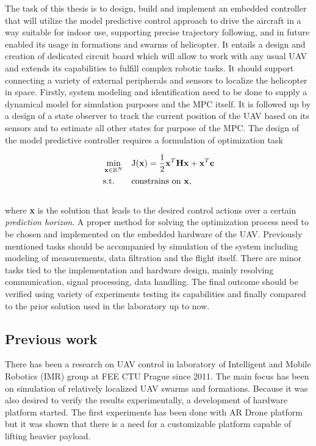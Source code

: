 The task of this thesis is to design, build and implement an embedded controller that will utilize the model predictive control approach to drive the aircraft in a way suitable for indoor use, supporting precise trajectory following, and in future enabled its usage in formations and swarms of helicopter. It entails a design and creation of dedicated circuit board which will allow to work with any usual UAV and extends its capabilities to fulfill complex robotic tasks. It should support connecting a variety of external peripherals and sensors to localize the helicopter in space. Firstly, system modeling and identification need to be done to supply a dynamical model for simulation purposes and the MPC itself. It is followed up by a design of a state observer to track the current position of the UAV based on its sensors and to estimate all other states for purpose of the MPC. The design of the model predictive controller requires a formulation of optimization task

\begin{equation}
\label{eq:qmpc_intro}
\begin{aligned}
& \min_{\textbf{x} \in \mathbb{R}^{N}}
& & \mathrm{J}(\textbf{x}) = \frac{1}{2}\textbf{x}^T\textbf{H}\textbf{x} + \textbf{x}^T\textbf{c}\\
& \text{s.t.}
& & \text{constrains on \textbf{x}},
\end{aligned}
\end{equation}
\\
where \textbf{x} is the solution that leads to the desired control actions over a certain \emph{prediction horizon}. A proper method for solving the optimization process need to be chosen and implemented on the embedded hardware of the UAV. Previously mentioned tasks should be accompanied by simulation of the system including modeling of measurements, data filtration and the flight itself. There are minor tasks tied to the implementation and hardware design, mainly resolving communication, signal processing, data handling. The final outcome should be verified using variety of experiments testing its capabilities and finally compared to the prior solution used in the laboratory up to now.

\subsection{Previous work}
\label{cap:prior_work}

There has been a research on UAV control in laboratory of Intelligent and Mobile Robotics (IMR) group at FEE CTU Prague since 2011. The main focus has been on simulation of relatively localized UAV swarms and formations. Because it was also desired to verify the results experimentally, a development of hardware platform started. The first experiments has been done with AR Drone platform \citep{kranik2012drone} but it was shown that there is a need for a customizable platform capable of lifting heavier payload.

